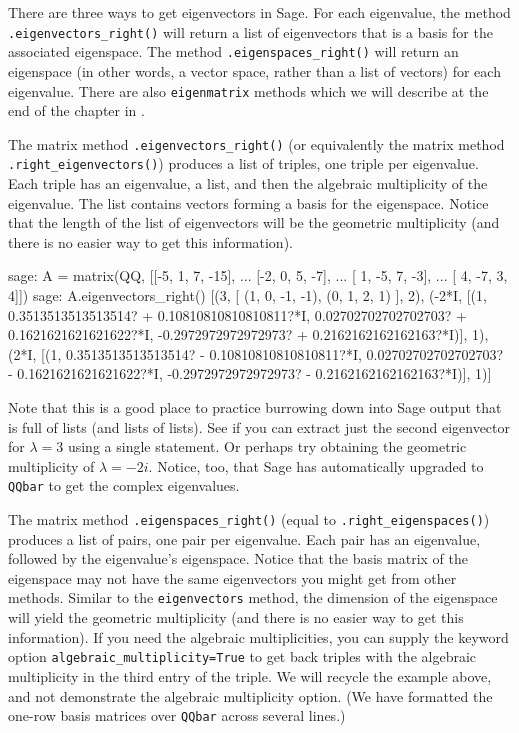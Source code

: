 There are three ways to get eigenvectors in Sage.  For each eigenvalue, the method \verb!.eigenvectors_right()! will return a list of eigenvectors that is a basis for the associated eigenspace.  The method \verb!.eigenspaces_right()! will return an eigenspace (in other words, a vector space, rather than a list of vectors) for each eigenvalue.  There are also \verb!eigenmatrix! methods which we will describe at the end of the chapter in .\par
%
The matrix method \verb!.eigenvectors_right()! (or equivalently the matrix method \verb!.right_eigenvectors()!) produces a list of triples, one triple per eigenvalue.  Each triple has an eigenvalue, a list, and then the algebraic multiplicity of the eigenvalue.  The list contains vectors forming a basis for the eigenspace.  Notice that the length of the list of eigenvectors will be the geometric multiplicity (and there is no easier way to get this information).\par
%
%
\begin{sageexample}
sage: A = matrix(QQ, [[-5,  1, 7, -15],
...                   [-2,  0, 5,  -7],
...                   [ 1, -5, 7,  -3],
...                   [ 4, -7, 3,   4]])
sage: A.eigenvectors_right()
[(3, [
(1, 0, -1, -1),
(0, 1, 2, 1)
], 2),
(-2*I, [(1, 0.3513513513513514? + 0.10810810810810811?*I,
0.02702702702702703? + 0.1621621621621622?*I,
-0.2972972972972973? + 0.2162162162162163?*I)], 1),
(2*I, [(1, 0.3513513513513514? - 0.10810810810810811?*I,
0.02702702702702703? - 0.1621621621621622?*I,
-0.2972972972972973? - 0.2162162162162163?*I)], 1)]
\end{sageexample}
%
Note that this is a good place to practice burrowing down into Sage output that is full of lists (and lists of lists).  See if you can extract just the second eigenvector for $\lambda=3$ using a single statement.  Or perhaps try obtaining the geometric multiplicity of $\lambda=-2i$.  Notice, too, that Sage has automatically upgraded to \verb!QQbar! to get the complex eigenvalues.\par
%
The matrix method \verb!.eigenspaces_right()! (equal to \verb!.right_eigenspaces()!) produces a list of pairs, one pair per eigenvalue.  Each pair has an eigenvalue, followed by the eigenvalue's eigenspace.  Notice that the basis matrix of the eigenspace may not have the same eigenvectors you might get from other methods.  Similar to the \verb!eigenvectors! method, the dimension of the eigenspace will yield the geometric multiplicity (and there is no easier way to get this information).   If you need the algebraic multiplicities, you can supply the keyword option \verb!algebraic_multiplicity=True! to get back triples with the algebraic multiplicity in the third entry of the triple.  We will recycle the example above, and not demonstrate the algebraic multiplicity option.  (We have formatted the one-row  basis matrices over \verb?QQbar? across several lines.)
